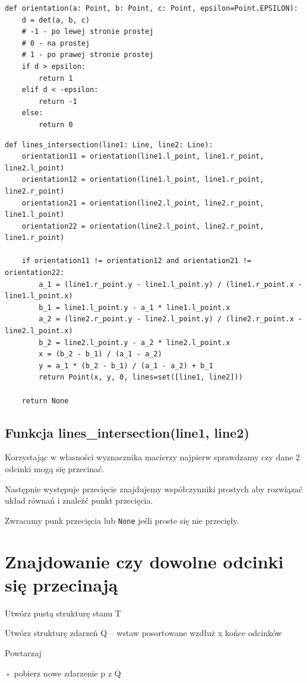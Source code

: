 \documentclass[12pt]{article}
\begin{document}
\begin{Verbatim}
def orientation(a: Point, b: Point, c: Point, epsilon=Point.EPSILON):
	d = det(a, b, c)
	# -1 - po lewej stronie prostej
	# 0 - na prostej
	# 1 - po prawej stronie prostej
	if d > epsilon:
		return 1
	elif d < -epsilon:
		return -1
	else:
		return 0
\end{Verbatim}


\begin{Verbatim}
def lines_intersection(line1: Line, line2: Line):
	orientation11 = orientation(line1.l_point, line1.r_point, line2.l_point)
	orientation12 = orientation(line1.l_point, line1.r_point, line2.r_point)
	orientation21 = orientation(line2.l_point, line2.r_point, line1.l_point)
	orientation22 = orientation(line2.l_point, line2.r_point, line1.r_point)
	
	if orientation11 != orientation12 and orientation21 != orientation22:
		a_1 = (line1.r_point.y - line1.l_point.y) / (line1.r_point.x - line1.l_point.x)
		b_1 = line1.l_point.y - a_1 * line1.l_point.x
		a_2 = (line2.r_point.y - line2.l_point.y) / (line2.r_point.x - line2.l_point.x)
		b_2 = line2.l_point.y - a_2 * line2.l_point.x
		x = (b_2 - b_1) / (a_1 - a_2)
		y = a_1 * (b_2 - b_1) / (a_1 - a_2) + b_1
		return Point(x, y, 0, lines=set([line1, line2]))
		
	return None
\end{Verbatim}
\subsection*{Funkcja lines\_intersection(line1, line2)}
\par
Korzystając w własności wyznacznika macierzy najpierw sprawdzamy czy dane 2 odcinki mogą się przecinać.

Następnie występuje przecięcie znajdujemy współczynniki prostych aby rozwiązać układ równań i znaleźć punkt przecięcia.

Zwracamy punk przecięcia lub \verb|None| jeśli proste się nie przecięły.

\newpage
\section*{Znajdowanie czy dowolne odcinki się przecinają}
Utwórz pustą strukturę stanu T

Utwórz strukturę zdarzeń Q – wstaw posortowane wzdłuż x końce odcinków

Powtarzaj

\quad ◦ pobierz nowe zdarzenie p z Q
\end{document}
